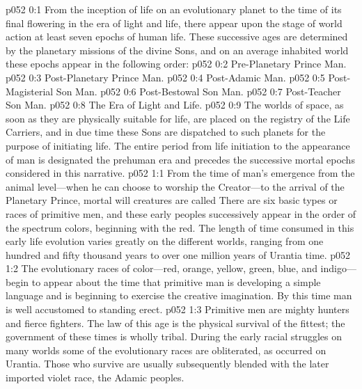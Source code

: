 \author{Mighty Messenger}
\vs p052 0:1 From the inception of life on an evolutionary planet to the time of its final flowering in the era of light and life, there appear upon the stage of world action at least seven epochs of human life. These successive ages are determined by the planetary missions of the divine Sons, and on an average inhabited world these epochs appear in the following order:
\pc \vs p052 0:2 \bibnobreakspace Pre\hyp{}Planetary Prince Man.
\vs p052 0:3 \bibnobreakspace Post\hyp{}Planetary Prince Man.
\vs p052 0:4 \bibnobreakspace Post\hyp{}Adamic Man.
\vs p052 0:5 \bibnobreakspace Post\hyp{}Magisterial Son Man.
\vs p052 0:6 \bibnobreakspace Post\hyp{}Bestowal Son Man.
\vs p052 0:7 \bibnobreakspace Post\hyp{}Teacher Son Man.
\vs p052 0:8 \bibnobreakspace The Era of Light and Life.
\pc \vs p052 0:9 The worlds of space, as soon as they are physically suitable for life, are placed on the registry of the Life Carriers, and in due time these Sons are dispatched to such planets for the purpose of initiating life. The entire period from life initiation to the appearance of man is designated the prehuman era and precedes the successive mortal epochs considered in this narrative.\plusone
{}
\vs p052 1:1 From the time of man’s emergence from the animal level---when he can choose to worship the Creator---to the arrival of the Planetary Prince, mortal will creatures are called  There are six basic types or races of primitive men, and these early peoples successively appear in the order of the spectrum colors, beginning with the red. The length of time consumed in this early life evolution varies greatly on the different worlds, ranging from one hundred and fifty thousand years to over one million years of Urantia time.
\vs p052 1:2 The evolutionary races of color---red, orange, yellow, green, blue, and indigo---begin to appear about the time that primitive man is developing a simple language and is beginning to exercise the creative imagination. By this time man is well accustomed to standing erect.
\pc \vs p052 1:3 Primitive men are mighty hunters and fierce fighters. The law of this age is the physical survival of the fittest; the government of these times is wholly tribal. During the early racial struggles on many worlds some of the evolutionary races are obliterated, as occurred on Urantia. Those who survive are usually subsequently blended with the later imported violet race, the Adamic peoples.
